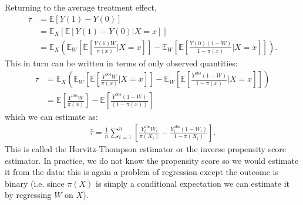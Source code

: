 \documentclass[twoside,12pt]{article}
\begin{document}
Returning to the average treatment effect, 
\begin{align*}
\tau &= \mathbb{E}[Y(1) - Y(0)] \\
&= \mathbb{E}_X [ \mathbb{E}[Y(1) - Y(0) | X = x] ] \\
&= \mathbb{E}_X \left( \mathbb{E}_{W}\left[ \mathbb{E}\left[ \frac{Y(1) W}{ \pi(x) } | X = x\right] \right]  - 
\mathbb{E}_{W}\left[ \mathbb{E}\left[ \frac{Y(0) (1 - W)}{ 1 - \pi(x) } | X = x\right] \right] \right).
\end{align*}
This in turn can be written in terms of only observed quantities:
\begin{align*}
\tau &= \mathbb{E}_X \left( \mathbb{E}_{W}\left[ \mathbb{E}\left[ \frac{Y^{\text{obs}}W}{ \pi(x) } | X = x\right] \right]  - 
\mathbb{E}_{W}\left[ \mathbb{E}\left[ \frac{Y^{\text{obs}} (1 - W)}{ 1 - \pi(x) } | X = x\right] \right] \right) \\
&= \mathbb{E}\left[ \frac{Y^{\text{obs}}W}{ \pi(x) }  \right] -  \mathbb{E}\left[ \frac{Y^{\text{obs}}(1-W)}{(1- \pi(x)) }  \right] 
\end{align*}
which we can estimate as:
\begin{align*}
\widehat{\tau} = \frac{1}{n} \sum_{i=1}^n  \left[\frac{Y_i^{\text{obs}} W_i}{\pi(X_i)} - \frac{Y_i^{\text{obs}} (1- W_i)}{1-\pi(X_i)}\right].
\end{align*}
This is called the Horvitz-Thompson estimator or the inverse propensity score estimator. In practice, we do not know the propensity score so we would estimate it from the data: this is again a problem of regression except the outcome is binary (i.e. since $\pi(X)$ is simply a conditional expectation we can estimate it by regressing $W$ on $X$). 
\end{document}
